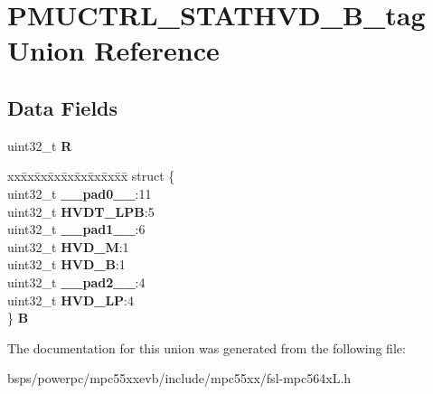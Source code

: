 \hypertarget{unionPMUCTRL__STATHVD__32B__tag}{}\section{P\+M\+U\+C\+T\+R\+L\+\_\+\+S\+T\+A\+T\+H\+V\+D\+\_\+B\+\_\+tag Union Reference}
\label{unionPMUCTRL__STATHVD__32B__tag}
\subsection*{Data Fields}
\begin{DoxyCompactItemize}
\item 
\mbox{\label{unionPMUCTRL__STATHVD__32B__tag_a34ad57c097deb5134834b4adfd85f661}} 
uint32\+\_\+t {\bfseries R}
\item 
\mbox{\label{unionPMUCTRL__STATHVD__32B__tag_ac4cf18d5ebe1fcda30225726e60cd961}} 
\begin{tabbing}
xx\=xx\=xx\=xx\=xx\=xx\=xx\=xx\=xx\=\kill
struct \{\\
\>uint32\_t {\bfseries \_\_pad0\_\_}:11\\
\>uint32\_t {\bfseries HVDT\_LPB}:5\\
\>uint32\_t {\bfseries \_\_pad1\_\_}:6\\
\>uint32\_t {\bfseries HVD\_M}:1\\
\>uint32\_t {\bfseries HVD\_B}:1\\
\>uint32\_t {\bfseries \_\_pad2\_\_}:4\\
\>uint32\_t {\bfseries HVD\_LP}:4\\
\} {\bfseries B}\\

\end{tabbing}\end{DoxyCompactItemize}


The documentation for this union was generated from the following file\+:\begin{DoxyCompactItemize}
\item 
bsps/powerpc/mpc55xxevb/include/mpc55xx/fsl-\/mpc564x\+L.\+h\end{DoxyCompactItemize}
